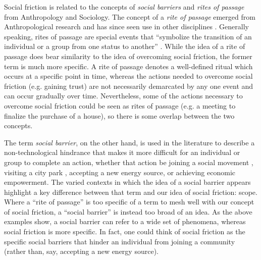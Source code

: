 \documentclass[sigconf,authordraft]{acmart}
\begin{document}
Social friction is related to the concepts of {\itshape social barriers} and {\itshape rites of passage} from Anthropology and Sociology. The concept of a {\itshape rite of passage} emerged from Anthropological research and has since seen use in other disciplines \cite{blackwell_ROP,guha2011routledge}. Generally speaking, rites of passage are special events that ``symbolize the transition of an individual or a group from one status to another'' \cite{blackwell_ROP}. While the idea of a rite of passage does bear similarity to the idea of overcoming social friction, the former term is much more specific. A rite of passage denotes a well-defined ritual which occurs at a specific point in time, whereas the actions needed to overcome social friction (e.g. gaining trust) are not necessarily demarcated by any one event and can occur gradually over time. Nevertheless, some of the actions necessary to overcome social friction could be seen as rites of passage (e.g. a meeting to finalize the purchase of a house), so there is some overlap between the two concepts.

The term {\itshape social barrier}, on the other hand, is used in the literature to describe a non-technological hindrance that makes it more difficult for an individual or group to complete an action, whether that action be joining a social movement \cite{klandermans1987potentials}, visiting a city park \cite{cutts2009city}, accepting a new energy source\cite{pasqualetti2011social}, or achieving economic empowerment\cite{woolcock2000removing}. The varied contexts in which the idea of a social barrier appears highlight a key difference between that term and our idea of social friction: scope. Where a ``rite of passage'' is too specific of a term to mesh well with our concept of social friction, a ``social barrier'' is instead too broad of an idea. As the above examples show, a social barrier can refer to a wide set of phenomena, whereas social friction is more specific. In fact, one could think of social friction as the specific social barriers that hinder an individual from joining a community (rather than, say, accepting a new energy source). 
\end{document}
